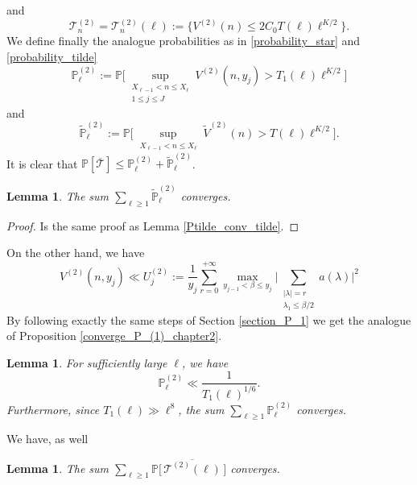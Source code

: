 \documentclass{article}
\newtheorem{lemma}[theorem]{Lemma}
\begin{document}
and
\begin{equation}\label{event_T_n_2}
    \mathcal{T}^{(2)}_n= \mathcal{T}^{(2)}_n(\ell) := \bigg\{  V^{(2)}(n) \leqslant 2C_0T(\ell)\ell^{K/2} \bigg\}.
\end{equation}
We define finally the analogue probabilities as in \eqref{probability_star} and \eqref{probability_tilde}
\begin{equation}\label{probability_star_2}
    \mathbb{P}^{(2)}_{\ell} := \mathbb{P}\bigg[ \sup_{\substack{ X_{\ell-1} < n\leqslant X_{\ell} \\1 \leqslant j\leqslant J }} V^{(2)}(n,y_j)> T_1(\ell)\ell^{K/2}  \bigg]
\end{equation}
and
\begin{equation}\label{probability_tilde_2}
    \widetilde{\mathbb{P}}^{(2)}_{\ell} := \mathbb{P}\bigg[ \sup_{\substack{ X_{\ell-1} < n\leqslant X_{\ell} }} \widetilde{V}^{(2)}(n) > T(\ell)\ell^{K/2}  \bigg].
\end{equation}
It is  clear that $ \mathbb{P}[\overline{\mathcal{T}}] \leqslant \mathbb{P}^{(2)}_{\ell}  +\widetilde{\mathbb{P}}^{(2)}_{\ell}$. 
\begin{lemma}\label{Ptilde_conv_2}
    The sum  $\sum_{\ell \geqslant 1} \widetilde{\mathbb{P}}^{(2)}_{\ell} $ converges.
\end{lemma}
\begin{proof}[Proof]
    Is the same proof as Lemma \ref{Ptilde_conv_tilde}.
\end{proof}
\noindent On the other hand, we have
$$
V^{(2)}(n,y_j) \ll U^{(2)}_j:=\frac{1}{y_j}  \sum_{r=0}^{+\infty} \max_{y_{j-1}<\beta \leqslant y_j}\bigg| \sum_{\substack{|\lambda|=r \\ \lambda_1 \leqslant \beta/2}} a(\lambda)\bigg|^2
$$
By following exactly the same steps of Section \ref{section_P_1} we get the analogue of Proposition \ref{converge_P_(1)_chapter2}.
\begin{lemma}\label{lemma_P_2_conv}
    For sufficiently large $\ell$, we have 
\begin{equation}
   \mathbb{P}_{\ell}^{(2)}  \ll \frac{1}{T_1(\ell)^{1/6}}.
\end{equation}
Furthermore, since $T_1(\ell)\gg \ell^8$, the sum $\sum_{\ell \geqslant 1} \mathbb{P}_{\ell}^{(2)} $ converges. 
\end{lemma}
\noindent We have, as well
\begin{lemma}\label{convergenceproba_T_2}
    The sum $\sum_{\ell \geqslant 1}\mathbb{P}\big[\,\overline{\mathcal{T}^{(2)}(\ell)} \,\big]$ converges.
\end{lemma}
\end{document}
